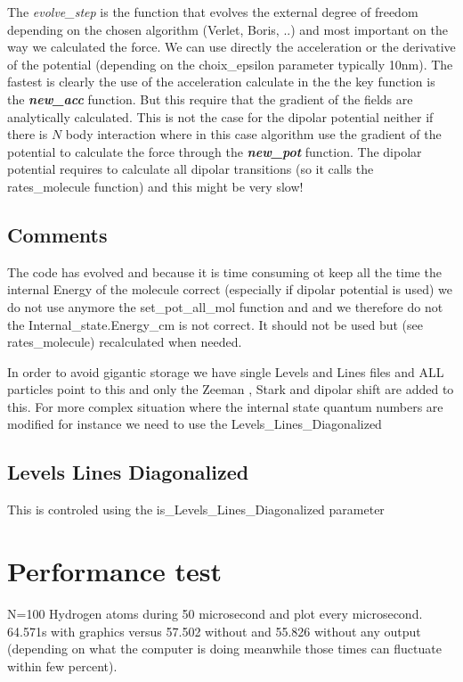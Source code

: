 \documentclass[amsmath,amssymb,nofootinbib]{revtex4-2}
\begin{document}
The \textit{ evolve\_step} is the function that evolves the external degree of freedom depending on the chosen algorithm (Verlet, Boris, ..) and most important on the way we calculated the force. We can use directly the acceleration or the derivative of the potential (depending on the choix\_epsilon parameter typically 10nm).
The fastest is clearly the use of the acceleration calculate in the 
 the key function is the  \textit{ \textbf{new\_acc}} function. But this require that the gradient of the fields are analytically calculated. This is not the case for the dipolar potential neither if there is $N$ body interaction where in this case algorithm use the gradient of the potential to calculate the force through the  \textit{ \textbf{new\_pot}} function. The dipolar potential requires to calculate all dipolar transitions (so it calls the rates\_molecule function) and this might be very slow!
 

 \subsection{Comments}
 
The code has evolved and because it is time consuming ot keep all the time the internal Energy of the molecule correct (especially if dipolar potential is used) we do not use anymore the
set\_pot\_all\_mol function and and we therefore do not 
the Internal\_state.Energy\_cm is not correct. It should not be used but (see  rates\_molecule) recalculated when needed.

In order to avoid gigantic storage we have single Levels and Lines files and ALL particles point to this and only the Zeeman , Stark and dipolar shift are added to this. For more complex situation where the internal state quantum numbers are modified for instance we need to use the Levels\_Lines\_Diagonalized 

	\subsection{Levels Lines Diagonalized }
This is controled using the is\_Levels\_Lines\_Diagonalized parameter

	\section{Performance test}
	
	 N=100 Hydrogen atoms during 50 microsecond and plot every microsecond.  64.571s with graphics versus 57.502 without and 55.826 without any output (depending on what the computer is doing meanwhile those times can fluctuate within few percent).
	 
\end{document}
